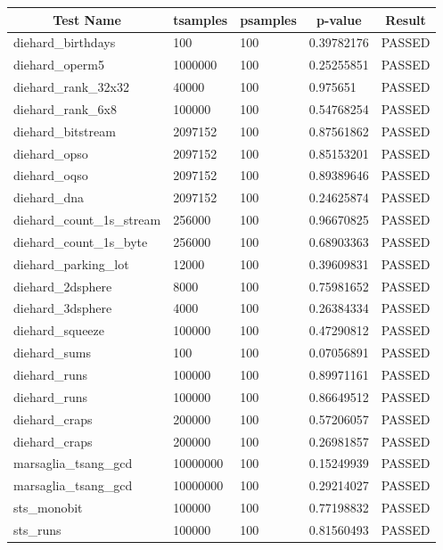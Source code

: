 \documentclass[titlepage, 11pt]{article}
\begin{document}
\begin{table}[!htb]
\begin{tabular}{l|l|l|l|c}
\hline
\multicolumn{1}{c|}{\textbf{Test Name}} & \multicolumn{1}{c|}{\textbf{tsamples}} & \multicolumn{1}{c|}{\textbf{psamples}} & \multicolumn{1}{c|}{\textbf{p-value}} & \textbf{Result} \\ \hline
diehard\_birthdays & 100 & 100 & 0.39782176 & PASSED \\
diehard\_operm5 & 1000000 & 100 & 0.25255851 & PASSED \\
diehard\_rank\_32x32 & 40000 & 100 & 0.975651 & PASSED \\
diehard\_rank\_6x8 & 100000 & 100 & 0.54768254 & PASSED \\
diehard\_bitstream & 2097152 & 100 & 0.87561862 & PASSED \\
diehard\_opso & 2097152 & 100 & 0.85153201 & PASSED \\
diehard\_oqso & 2097152 & 100 & 0.89389646 & PASSED \\
diehard\_dna & 2097152 & 100 & 0.24625874 & PASSED \\
diehard\_count\_1s\_stream & 256000 & 100 & 0.96670825 & PASSED \\
diehard\_count\_1s\_byte & 256000 & 100 & 0.68903363 & PASSED \\
diehard\_parking\_lot & 12000 & 100 & 0.39609831 & PASSED \\
diehard\_2dsphere & 8000 & 100 & 0.75981652 & PASSED \\
diehard\_3dsphere & 4000 & 100 & 0.26384334 & PASSED \\
diehard\_squeeze & 100000 & 100 & 0.47290812 & PASSED \\
diehard\_sums & 100 & 100 & 0.07056891 & PASSED \\
diehard\_runs & 100000 & 100 & 0.89971161 & PASSED \\
diehard\_runs & 100000 & 100 & 0.86649512 & PASSED \\
diehard\_craps & 200000 & 100 & 0.57206057 & PASSED \\
diehard\_craps & 200000 & 100 & 0.26981857 & PASSED \\
marsaglia\_tsang\_gcd & 10000000 & 100 & 0.15249939 & PASSED \\
marsaglia\_tsang\_gcd & 10000000 & 100 & 0.29214027 & PASSED \\
sts\_monobit & 100000 & 100 & 0.77198832 & PASSED \\
sts\_runs & 100000 & 100 & 0.81560493 & PASSED \\

\end{tabular}
\end{table}
\end{document}
